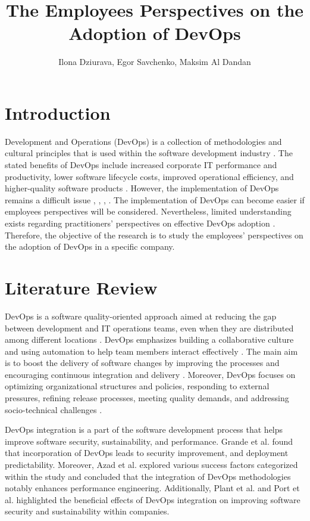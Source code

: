 \documentclass[oneside,final,12pt,a4paper]{extreport}
\title{The Employees Perspectives on the Adoption of DevOps}
\author{Ilona Dziurava, Egor Savchenko, Maksim Al Dandan}
\affil{Innopolis University}
\begin{document}
\maketitle

\newpage


\section{Introduction}

Development and Operations (DevOps) is a collection of methodologies and cultural principles that is used within the software development industry \cite{int1}. The stated benefits of DevOps include increased corporate IT performance and productivity, lower software lifecycle costs, improved operational efficiency, and higher-quality software products \cite{int1}. However, the implementation of DevOps remains a difficult issue \cite{int2}, \cite{8}, \cite{20}, \cite{14}. The  implementation of DevOps can become easier if employees perspectives will be considered. Nevertheless, limited understanding exists regarding practitioners' perspectives on effective DevOps adoption \cite{10}. Therefore, the objective of the research is to study the employees' perspectives on the adoption of DevOps in a specific company.

\section{Literature Review}

DevOps is a software quality-oriented approach aimed at reducing the gap between development and IT operations teams, even when they are distributed among different locations \cite{17}. DevOps emphasizes building a collaborative culture and using automation to help team members interact effectively \cite{7}. The main aim is to boost the delivery of software changes by improving the processes and encouraging continuous integration and delivery \cite{11}. Moreover, DevOps focuses on optimizing organizational structures and policies, responding to external pressures, refining release processes, meeting quality demands, and addressing socio-technical challenges \cite{7}.

DevOps integration is a part of the software development process that helps improve software security, sustainability, and performance. Grande et al. \cite{7} found that incorporation of DevOps leads to security improvement, and deployment predictability. Moreover, Azad et al. \cite{9} explored various success factors categorized within the study and concluded that the integration of DevOps methodologies notably enhances performance engineering. Additionally, Plant et al. \cite{12} and Port et al. \cite{18} highlighted the beneficial effects of DevOps integration on improving software security and sustainability within companies. 
\end{document}
